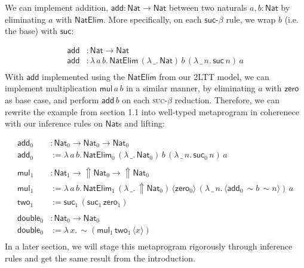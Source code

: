 \begin{example}
    We can implement addition, $\mathsf{add}:\mathsf{Nat}\to\mathsf{Nat}$ between two naturals $a,b:\mathsf{Nat}$ by eliminating $a$ with $\mathsf{NatElim}$. More specifically, on each $\textsf{suc-}\beta$ rule, we wrap $b$ (i.e. the base) with $\mathsf{suc}$:

    $$
    \begin{aligned}
        \mathsf{add}&:\mathsf{Nat}\to\mathsf{Nat}\\
        \mathsf{add}&:\lambda\,a\,b.\,\mathsf{NatElim}\,(\lambda\,\_.\,\mathsf{Nat})\,b\,(\lambda\,\_\,n.\,\mathsf{suc}\,n)\,a\\
    \end{aligned}
    $$
    With $\mathsf{add}$ implemented using the $\mathsf{NatElim}$ from our 2LTT model, we can implement multiplication $\mathsf{mul}\,a\,b$ in a similar manner, by eliminating $a$ with $\mathsf{zero}$ as base case, and perform $\mathsf{add}\,b$ on each \textsc{suc-$\beta$} reduction. Therefore, we can rewrite the example from section 1.1 into well-typed metaprogram in coherenece with our inference rules on $\mathsf{Nat}$s and lifting:

    $$
    \begin{aligned}
        \mathsf{add}_0&:\mathsf{Nat}_0\to\mathsf{Nat}_0\to\mathsf{Nat}_0\\
        \mathsf{add}_0&:=\lambda\,a\,b.\,\mathsf{NatElim}_0\,(\lambda\,\_.\,\mathsf{Nat}_0)\,b\,(\lambda\,\_\,n.\,\mathsf{suc}_0\,n)\,a\\
        \\
        \mathsf{mul}_1&:\mathsf{Nat}_1\to{\Uparrow}\mathsf{Nat}_0\to{\Uparrow}\mathsf{Nat}_0\\
        \mathsf{mul}_1&:=\lambda\,a\,b.\,\mathsf{NatElim}_1\,(\lambda\,\_.\,{\Uparrow}\mathsf{Nat}_0)\,\langle \mathsf{zero}_0\rangle\,(\lambda\,\_\,n.\,\langle \mathsf{add}_0\,{\sim}b\,{\sim}n\rangle)\,a\\
        \mathsf{two}_1&:=\mathsf{suc}_1\,(\mathsf{suc}_1\,\mathsf{zero}_1)\\
        \\
        \mathsf{double}_0&:\mathsf{Nat}_0\to\mathsf{Nat}_0\\
        \mathsf{double}_0&:=\lambda\,x.\,{\sim}(\mathsf{mul}_1\,\mathsf{two}_1\,\langle x\rangle)\\
    \end{aligned}
    $$
    In a later section, we will stage this metaprogram rigorously through inference rules and get the same result from the introduction.
\end{example}

